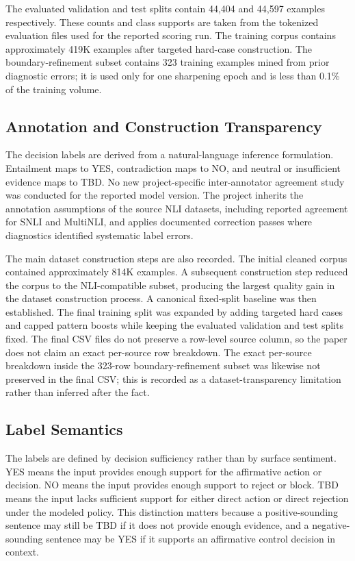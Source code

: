 \documentclass[11pt]{article}
\begin{document}
The evaluated validation and test splits contain 44,404 and 44,597 examples respectively. These counts and class supports are taken from the tokenized evaluation files used for the reported scoring run. The training corpus contains approximately 419K examples after targeted hard-case construction. The boundary-refinement subset contains 323 training examples mined from prior diagnostic errors; it is used only for one sharpening epoch and is less than 0.1\% of the training volume.

\subsection{Annotation and Construction Transparency}

The decision labels are derived from a natural-language inference formulation. Entailment maps to YES, contradiction maps to NO, and neutral or insufficient evidence maps to TBD. No new project-specific inter-annotator agreement study was conducted for the reported model version. The project inherits the annotation assumptions of the source NLI datasets, including reported agreement for SNLI and MultiNLI, and applies documented correction passes where diagnostics identified systematic label errors.

The main dataset construction steps are also recorded. The initial cleaned corpus contained approximately 814K examples. A subsequent construction step reduced the corpus to the NLI-compatible subset, producing the largest quality gain in the dataset construction process. A canonical fixed-split baseline was then established. The final training split was expanded by adding targeted hard cases and capped pattern boosts while keeping the evaluated validation and test splits fixed. The final CSV files do not preserve a row-level source column, so the paper does not claim an exact per-source row breakdown. The exact per-source breakdown inside the 323-row boundary-refinement subset was likewise not preserved in the final CSV; this is recorded as a dataset-transparency limitation rather than inferred after the fact.

\subsection{Label Semantics}

The labels are defined by decision sufficiency rather than by surface sentiment. YES means the input provides enough support for the affirmative action or decision. NO means the input provides enough support to reject or block. TBD means the input lacks sufficient support for either direct action or direct rejection under the modeled policy. This distinction matters because a positive-sounding sentence may still be TBD if it does not provide enough evidence, and a negative-sounding sentence may be YES if it supports an affirmative control decision in context.
\end{document}

